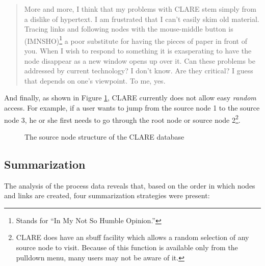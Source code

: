 \small
\begin{quote}
  More and more, I think that my problems with CLARE stem simply from a
  dislike of hypertext. I am frustrated that I can't easily skim old
  material.  Tracing links and following nodes with the mouse-middle
  button is (IMNSHO)\footnote{Stands for ``In My Not So Humble Opinion.''} a
  poor substitute for having the pieces of paper in front of you. When I
  wish to respond to something it is exasperating to have the node
  disappear as a new window opens up over it. Can these problems be
  addressed by current technology? I don't know. Are they critical? I
  guess that depends on one's viewpoint. To me, yes.
\end{quote}
\normalsize
{}

And finally, as shown in Figure \ref{fig:source-structure}, CLARE currently
does not allow easy {\it random\/} access. For example, if a user wants to
jump from the source node 1 to the source node 3, he or she first needs to
go through the root node or source node 2\footnote{CLARE does have an {\sf
sbuff} facility which allows a random selection of any source node to
visit.  Because of this function is available only from the pulldown menu,
many users may not be aware of it.}.

\begin{figure}[hbtp]
 \caption{The source node structure of the CLARE database}
  \label{fig:source-structure}
\end{figure}


\subsection{Summarization}
\label{sec:sum-strategies}

The analysis of the process data reveals that, based on the order in which
nodes and links are created, four summarization strategies were present:

